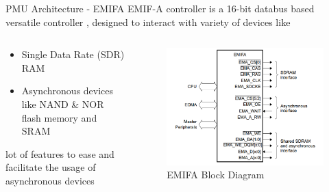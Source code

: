 \documentclass{beamer}
\begin{document}
\begin{frame}{PMU Architecture - EMIFA}
EMIF-A controller is a 16-bit databus based versatile controller \cite{uguide:emifa}, designed to interact with variety of devices like 
\begin{columns}
\begin{column}{0.5\textwidth}

	\begin{itemize}
	\item Single Data Rate (SDR) RAM
	\item Asynchronous devices like NAND \& NOR flash memory and SRAM
	\end{itemize}
	lot of features to ease and facilitate the usage of asynchronous devices
	\end{column}

\begin{column}{0.5\textwidth}
	\begin{figure}
	\includegraphics[width=\columnwidth]{fig/EMIFA.png}
	\caption{EMIFA Block Diagram \cite{uguide:emifa} }
	\label{fig:EMIFA}
	\end{figure}
\end{column}
\end{columns}
\end{frame}
\end{document}
